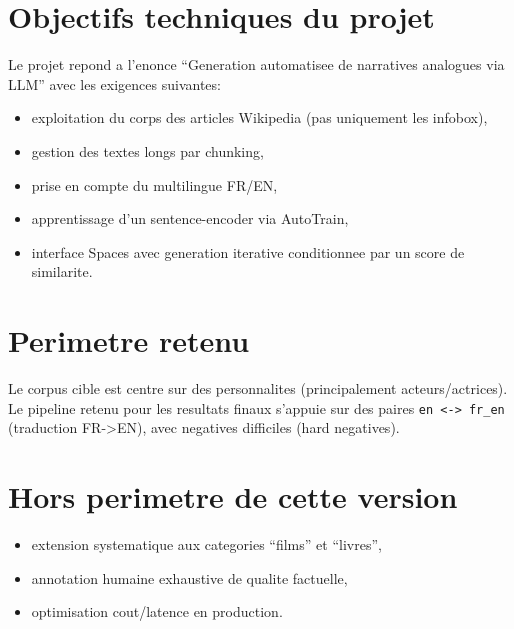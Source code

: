 \section{Objectifs techniques du projet}
Le projet repond a l'enonce ``Generation automatisee de narratives analogues via LLM''
avec les exigences suivantes:
\begin{itemize}[leftmargin=2em]
  \item exploitation du corps des articles Wikipedia (pas uniquement les infobox),
  \item gestion des textes longs par chunking,
  \item prise en compte du multilingue FR/EN,
  \item apprentissage d'un sentence-encoder via AutoTrain,
  \item interface Spaces avec generation iterative conditionnee par un score de similarite.
\end{itemize}

\section{Perimetre retenu}
Le corpus cible est centre sur des personnalites (principalement acteurs/actrices).
Le pipeline retenu pour les resultats finaux s'appuie sur des paires
\texttt{en <-> fr\_en} (traduction FR->EN), avec negatives difficiles (hard negatives).

\section{Hors perimetre de cette version}
\begin{itemize}[leftmargin=2em]
  \item extension systematique aux categories ``films'' et ``livres'',
  \item annotation humaine exhaustive de qualite factuelle,
  \item optimisation cout/latence en production.
\end{itemize}
